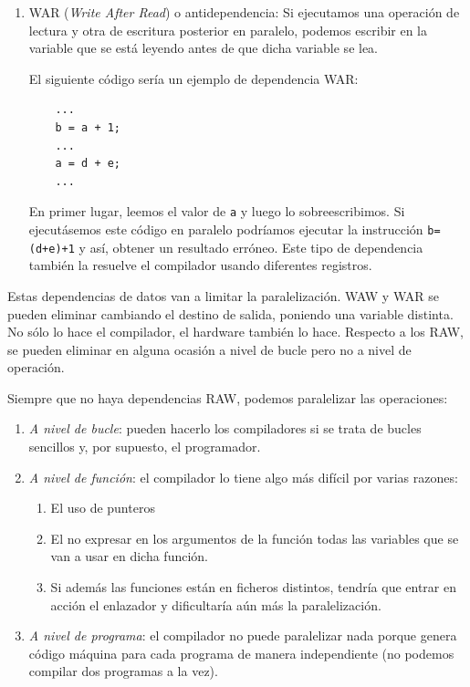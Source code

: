 \documentclass[10pt,a4paper,spanish]{report}
\begin{document}
\begin{enumerate}[\color{azul}{\bf $\heartsuit$}]
    \item WAR (\textit{\textcolor[rgb]{0.2,0.4,0.8}{Write After Read}}) o antidependencia: Si ejecutamos una operación de lectura y otra de escritura posterior en paralelo, podemos escribir en la variable que se está leyendo antes de que dicha variable se lea.

    El siguiente código sería un ejemplo de dependencia WAR:
    \begin{verbatim}
    ...
    b = a + 1;
    ...
    a = d + e;
    ...
    \end{verbatim}

    En primer lugar, leemos el valor de \verb*|a| y luego lo sobreescribimos. Si ejecutásemos este código en paralelo podríamos ejecutar la instrucción \verb*|b=(d+e)+1| y así, obtener un resultado erróneo. Este tipo de dependencia también la resuelve el compilador usando diferentes registros.
\end{enumerate}

Estas dependencias de datos van a limitar la paralelización. WAW y WAR se pueden eliminar cambiando el destino de salida, poniendo una variable distinta. No sólo lo hace el compilador, el hardware también lo hace. Respecto a los RAW, se pueden eliminar en alguna ocasión a nivel de bucle pero no a nivel de operación. 

Siempre que no haya dependencias RAW, podemos paralelizar las operaciones:
\begin{enumerate}[\color{azul}{\bf $\heartsuit$}]
    \item \textit{\textcolor[rgb]{0.2,0.4,0.8}{A nivel de bucle}}: pueden hacerlo los compiladores si se trata de bucles sencillos y, por supuesto, el programador.
    \item \textit{\textcolor[rgb]{0.2,0.4,0.8}{A nivel de función}}: el compilador lo tiene algo más difícil por varias razones:
    \begin{enumerate}[$\longrightarrow$]
        \item El uso de punteros
        \item El no expresar en los argumentos de la función todas las variables que se van a usar en dicha función.
        \item Si además las funciones están en ficheros distintos, tendría que entrar en acción el enlazador y dificultaría aún más la paralelización.
    \end{enumerate}
    \item \textit{\textcolor[rgb]{0.2,0.4,0.8}{A nivel de programa}}: el compilador no puede paralelizar nada porque genera código máquina para cada programa de manera independiente (no podemos compilar dos programas a la vez).
\end{enumerate}
\end{document}
